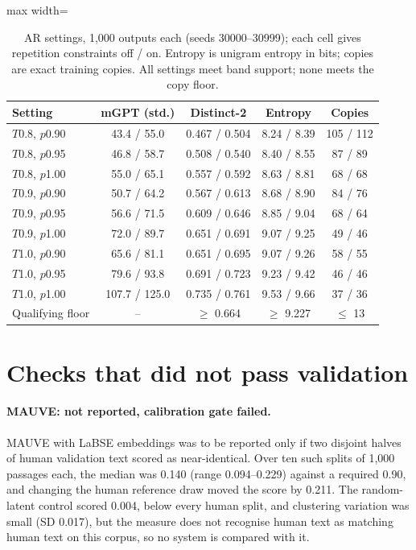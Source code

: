 \documentclass[11pt,a4paper]{article}
\begin{document}
\begin{table}[h]
\centering
\small
\begin{adjustbox}{max width=\columnwidth}
\begin{tabular}{lcccc}
\toprule
Setting & mGPT (std.) & Distinct-2 & Entropy & Copies \\
\midrule
$T$0.8, $p$0.90 & 43.4 / 55.0 & 0.467 / 0.504 & 8.24 / 8.39 & 105 / 112 \\
$T$0.8, $p$0.95 & 46.8 / 58.7 & 0.508 / 0.540 & 8.40 / 8.55 & 87 / 89 \\
$T$0.8, $p$1.00 & 55.0 / 65.1 & 0.557 / 0.592 & 8.63 / 8.81 & 68 / 68 \\
$T$0.9, $p$0.90 & 50.7 / 64.2 & 0.567 / 0.613 & 8.68 / 8.90 & 84 / 76 \\
$T$0.9, $p$0.95 & 56.6 / 71.5 & 0.609 / 0.646 & 8.85 / 9.04 & 68 / 64 \\
$T$0.9, $p$1.00 & 72.0 / 89.7 & 0.651 / 0.691 & 9.07 / 9.25 & 49 / 46 \\
$T$1.0, $p$0.90 & 65.6 / 81.1 & 0.651 / 0.695 & 9.07 / 9.26 & 58 / 55 \\
$T$1.0, $p$0.95 & 79.6 / 93.8 & 0.691 / 0.723 & 9.23 / 9.42 & 46 / 46 \\
$T$1.0, $p$1.00 & 107.7 / 125.0 & 0.735 / 0.761 & 9.53 / 9.66 & 37 / 36 \\
\midrule
Qualifying floor & -- & $\geq$ 0.664 & $\geq$ 9.227 & $\leq$ 13 \\
\bottomrule
\end{tabular}
\end{adjustbox}
\caption{AR settings, 1,000 outputs each (seeds 30000--30999); each cell gives repetition constraints off / on. Entropy is unigram entropy in bits; copies are exact training copies. All settings meet band support; none meets the copy floor.}
\label{tab:argrid}
\end{table}

\section{Checks that did not pass validation}
\label{app:failedgates}

\paragraph{MAUVE: not reported, calibration gate failed.} MAUVE \citep{pillutla2021mauve} with LaBSE embeddings \citep{feng2022labse} was to be reported only if two disjoint halves of human validation text scored as near-identical. Over ten such splits of 1,000 passages each, the median was 0.140 (range 0.094--0.229) against a required 0.90, and changing the human reference draw moved the score by 0.211. The random-latent control scored 0.004, below every human split, and clustering variation was small (SD 0.017), but the measure does not recognise human text as matching human text on this corpus, so no system is compared with it.
\end{document}
